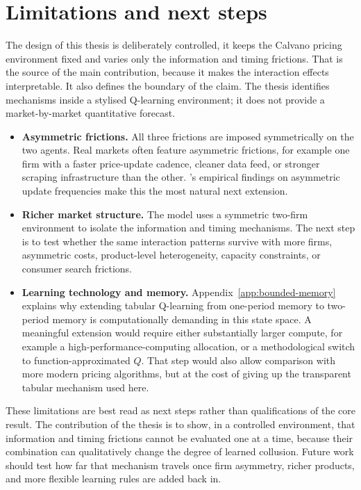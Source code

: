\section{Limitations and next steps}
\label{sec:limitations}

The design of this thesis is deliberately controlled, it keeps the Calvano pricing environment fixed and varies only the information and timing frictions. That is the source of the main contribution, because it makes the interaction effects interpretable. It also defines the boundary of the claim. The thesis identifies mechanisms inside a stylised Q-learning environment; it does not provide a market-by-market quantitative forecast.

\begin{itemize}[topsep=2pt, itemsep=4pt]
    \item \textbf{Asymmetric frictions.} All three frictions are imposed symmetrically on the two agents. Real markets often feature asymmetric frictions, for example one firm with a faster price-update cadence, cleaner data feed, or stronger scraping infrastructure than the other. \citet{brown2023}'s empirical findings on asymmetric update frequencies make this the most natural next extension.
    \item \textbf{Richer market structure.} The model uses a symmetric two-firm environment to isolate the information and timing mechanisms. The next step is to test whether the same interaction patterns survive with more firms, asymmetric costs, product-level heterogeneity, capacity constraints, or consumer search frictions.
    \item \textbf{Learning technology and memory.} Appendix~\ref{app:bounded-memory} explains why extending tabular Q-learning from one-period memory to two-period memory is computationally demanding in this state space. A meaningful extension would require either substantially larger compute, for example a high-performance-computing allocation, or a methodological switch to function-approximated $Q$. That step would also allow comparison with more modern pricing algorithms, but at the cost of giving up the transparent tabular mechanism used here.
\end{itemize}

These limitations are best read as next steps rather than qualifications of the core result. The contribution of the thesis is to show, in a controlled environment, that information and timing frictions cannot be evaluated one at a time, because their combination can qualitatively change the degree of learned collusion. Future work should test how far that mechanism travels once firm asymmetry, richer products, and more flexible learning rules are added back in.
